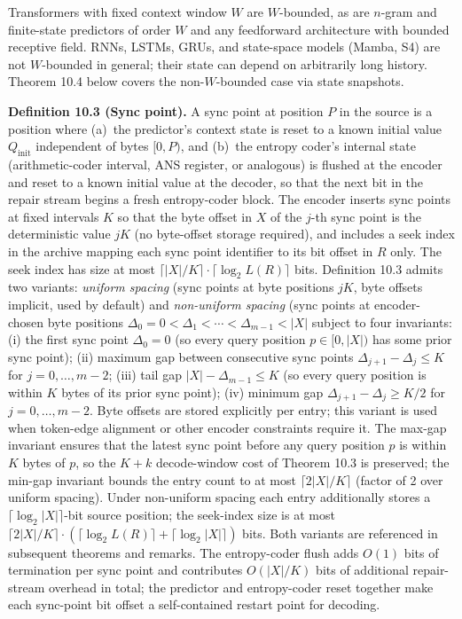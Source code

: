 \documentclass[
]{article}
\begin{document}
Transformers with fixed context window $W$ are $W$-bounded, as are
$n$-gram and finite-state predictors of order $W$ and any feedforward
architecture with bounded receptive field. RNNs, LSTMs, GRUs, and
state-space models (Mamba, S4) are not $W$-bounded in general; their
state can depend on arbitrarily long history. Theorem 10.4 below
covers the non-$W$-bounded case via state snapshots.

\textbf{Definition 10.3 (Sync point).} A sync point at position $P$ in
the source is a position where (a)~the predictor's context state is
reset to a known initial value $Q_{\text{init}}$ independent of bytes
$[0, P)$, and (b)~the entropy coder's internal state (arithmetic-coder
interval, ANS register, or analogous) is flushed at the encoder and
reset to a known initial value at the decoder, so that the next bit
in the repair stream begins a fresh entropy-coder block. The encoder
inserts sync points at fixed intervals $K$ so that the byte offset
in $X$ of the $j$-th sync point is the deterministic value $j K$
(no byte-offset storage required), and includes a seek index in the
archive mapping each sync point identifier to its bit offset in $R$
only. The seek index has size at most
$\lceil |X|/K \rceil \cdot \lceil \log_2 L(R) \rceil$ bits.
Definition 10.3 admits two variants: \emph{uniform spacing} (sync
points at byte positions $j K$, byte offsets implicit, used by
default) and \emph{non-uniform spacing} (sync points at
encoder-chosen byte positions $\Delta_0 = 0 < \Delta_1 < \cdots <
\Delta_{m-1} < |X|$ subject to four invariants: (i) the first
sync point $\Delta_0 = 0$ (so every query position $p \in [0, |X|)$
has some prior sync point); (ii) maximum gap between consecutive
sync points $\Delta_{j+1} - \Delta_j \leq K$ for $j = 0, \dots,
m-2$; (iii) tail gap $|X| - \Delta_{m-1} \leq K$ (so every query
position is within $K$ bytes of its prior sync point); (iv)
minimum gap $\Delta_{j+1} - \Delta_j \geq K/2$ for $j = 0, \dots,
m-2$. Byte offsets are stored explicitly per entry; this variant
is used when token-edge alignment or other encoder constraints
require it. The max-gap invariant ensures that the latest sync
point before any query position $p$ is within $K$ bytes of $p$, so
the $K + k$ decode-window cost of Theorem 10.3 is preserved; the
min-gap invariant bounds the entry count to at most
$\lceil 2 |X|/K \rceil$ (factor of 2 over uniform spacing). Under
non-uniform spacing each entry additionally stores a
$\lceil \log_2 |X| \rceil$-bit source position; the
seek-index size is at most
$\lceil 2 |X|/K \rceil \cdot (\lceil \log_2 L(R) \rceil + \lceil
\log_2 |X| \rceil)$ bits. Both variants are referenced in
subsequent theorems and remarks.
The entropy-coder flush adds $O(1)$ bits of termination per sync
point and contributes $O(|X|/K)$ bits of additional repair-stream
overhead in total; the predictor and entropy-coder reset together
make each sync-point bit offset a self-contained restart point for
decoding.
\end{document}
